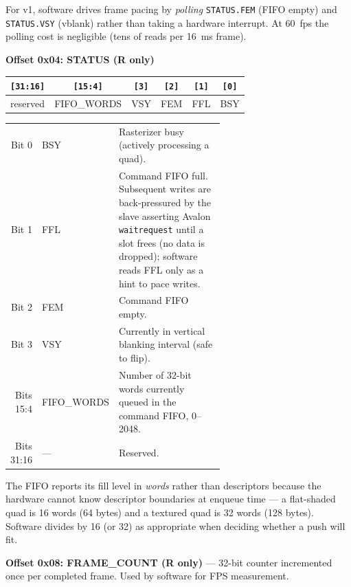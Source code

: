 \documentclass[11pt]{article}
\begin{document}
\vspace{0.3em}
\noindent For v1, software drives frame pacing by \emph{polling} \texttt{STATUS.FEM} (FIFO empty) and \texttt{STATUS.VSY} (vblank) rather than taking a hardware interrupt. At 60~fps the polling cost is negligible (tens of reads per 16~ms frame).

\vspace{0.8em}
\noindent\textbf{Offset 0x04: STATUS (R only)}
\vspace{0.3em}

\begin{center}
\begin{tabular}{|c|c|c|c|c|c|}
\hline
\texttt{[31:16]} & \texttt{[15:4]} & \texttt{[3]} & \texttt{[2]} & \texttt{[1]} & \texttt{[0]} \\
\hline
reserved & FIFO\_WORDS & VSY & FEM & FFL & BSY \\
\hline
\end{tabular}
\end{center}

\begin{tabular}{rlp{0.62\linewidth}}
Bit 0 & BSY & Rasterizer busy (actively processing a quad). \\
Bit 1 & FFL & Command FIFO full. Subsequent writes are back-pressured by the slave asserting Avalon \texttt{waitrequest} until a slot frees (no data is dropped); software reads FFL only as a hint to pace writes. \\
Bit 2 & FEM & Command FIFO empty. \\
Bit 3 & VSY & Currently in vertical blanking interval (safe to flip). \\
Bits 15:4 & FIFO\_WORDS & Number of 32-bit words currently queued in the command FIFO, 0--2048. \\
Bits 31:16 & --- & Reserved. \\
\end{tabular}

\vspace{0.3em}
\noindent The FIFO reports its fill level in \emph{words} rather than descriptors because the hardware cannot know descriptor boundaries at enqueue time --- a flat-shaded quad is 16 words (64 bytes) and a textured quad is 32 words (128 bytes). Software divides by 16 (or 32) as appropriate when deciding whether a push will fit.

\vspace{0.8em}
\noindent\textbf{Offset 0x08: FRAME\_COUNT (R only)} --- 32-bit counter incremented once per completed frame. Used by software for FPS measurement.
\end{document}
